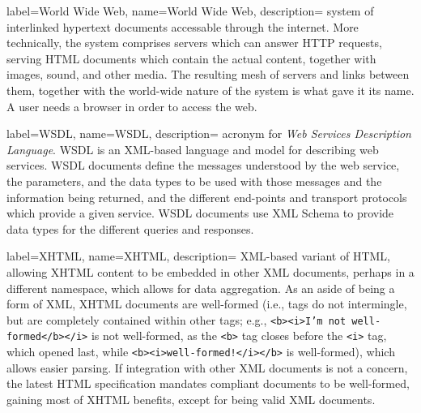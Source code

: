 {
    label={World Wide Web},
    name={World Wide Web},
    description={
    	system of interlinked \gls{hypertext} documents accessable
        through the internet. More technically, the system comprises
        servers which can answer \gls{HTTP} requests, serving
        \gls{HTML} documents which contain the actual content, together
        with images, sound, and other media. The resulting mesh of
        servers and links between them, together with the world-wide
        nature of the system is what gave it its name. A user needs a
        \gls{browser} in order to access the web.
    }
}

{
    label={WSDL},
    name={WSDL},
    description={
		acronym for \emph{Web Services Description Language}. WSDL
		is an \gls{XML}-based language and model for describing
		\gls{web services}. WSDL documents define the messages
		understood by the web service, the parameters, and the data
		types to be used with those messages and the information
		being returned, and the different end-points and transport
		protocols which provide a given service. WSDL documents use
		\gls{XML Schema} to provide data types for the different
		queries and responses.
    }
}

{
    label={XHTML},
    name={XHTML},
    description={
    	\gls{XML}-based variant of \gls{HTML}, allowing XHTML content
        to be embedded in other XML documents, perhaps in a different
        namespace, which allows for data aggregation. As an aside of
        being a form of XML, XHTML documents are well-formed (i.e.,
        \gls{tags} do not intermingle, but are completely contained
        within other tags; e.g., \texttt{<b><i>I'm not
        well-formed</b></i>} is not well-formed, as the \texttt{<b>}
        tag closes before the \texttt{<i>} tag, which opened last,
        while \texttt{<b><i>well-formed!</i></b>} is well-formed),
        which allows easier parsing. If integration with other XML
        documents is not a concern, the latest HTML specification
        mandates compliant documents to be well-formed, gaining most of
        XHTML benefits, except for being valid XML documents.
    }
}

